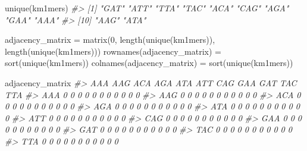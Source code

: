 \documentclass[
]{book}
\newenvironment{Shaded}{\begin{snugshade}}{\end{snugshade}}
\newcommand{\CommentTok}[1]{\textcolor[rgb]{0.56,0.35,0.01}{\textit{#1}}}
\newcommand{\DecValTok}[1]{\textcolor[rgb]{0.00,0.00,0.81}{#1}}
\newcommand{\FunctionTok}[1]{\textcolor[rgb]{0.00,0.00,0.00}{#1}}
\newcommand{\NormalTok}[1]{#1}
\newcommand{\OtherTok}[1]{\textcolor[rgb]{0.56,0.35,0.01}{#1}}
\begin{document}
\begin{Shaded}
\begin{Highlighting}[]
\FunctionTok{unique}\NormalTok{(km1mers)}
\CommentTok{\#\textgreater{}  [1] "GAT" "ATT" "TTA" "TAC" "ACA" "CAG" "AGA" "GAA" "AAA"}
\CommentTok{\#\textgreater{} [10] "AAG" "ATA"}
\end{Highlighting}
\end{Shaded}

\begin{Shaded}
\begin{Highlighting}[]
\NormalTok{adjacency\_matrix }\OtherTok{=} \FunctionTok{matrix}\NormalTok{(}\DecValTok{0}\NormalTok{, }\FunctionTok{length}\NormalTok{(}\FunctionTok{unique}\NormalTok{(km1mers)), }\FunctionTok{length}\NormalTok{(}\FunctionTok{unique}\NormalTok{(km1mers)))}
\FunctionTok{rownames}\NormalTok{(adjacency\_matrix) }\OtherTok{=} \FunctionTok{sort}\NormalTok{(}\FunctionTok{unique}\NormalTok{(km1mers))}
\FunctionTok{colnames}\NormalTok{(adjacency\_matrix) }\OtherTok{=} \FunctionTok{sort}\NormalTok{(}\FunctionTok{unique}\NormalTok{(km1mers))}

\NormalTok{adjacency\_matrix}
\CommentTok{\#\textgreater{}     AAA AAG ACA AGA ATA ATT CAG GAA GAT TAC TTA}
\CommentTok{\#\textgreater{} AAA   0   0   0   0   0   0   0   0   0   0   0}
\CommentTok{\#\textgreater{} AAG   0   0   0   0   0   0   0   0   0   0   0}
\CommentTok{\#\textgreater{} ACA   0   0   0   0   0   0   0   0   0   0   0}
\CommentTok{\#\textgreater{} AGA   0   0   0   0   0   0   0   0   0   0   0}
\CommentTok{\#\textgreater{} ATA   0   0   0   0   0   0   0   0   0   0   0}
\CommentTok{\#\textgreater{} ATT   0   0   0   0   0   0   0   0   0   0   0}
\CommentTok{\#\textgreater{} CAG   0   0   0   0   0   0   0   0   0   0   0}
\CommentTok{\#\textgreater{} GAA   0   0   0   0   0   0   0   0   0   0   0}
\CommentTok{\#\textgreater{} GAT   0   0   0   0   0   0   0   0   0   0   0}
\CommentTok{\#\textgreater{} TAC   0   0   0   0   0   0   0   0   0   0   0}
\CommentTok{\#\textgreater{} TTA   0   0   0   0   0   0   0   0   0   0   0}
\end{Highlighting}
\end{Shaded}
\end{document}
